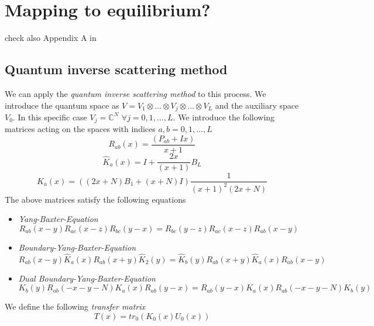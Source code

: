 \documentclass[11pt]{article}
\numberwithin{equation}{section}
\numberwithin{equation}{subsection}
\begin{document}
\section{Mapping to equilibrium?}
{\color{red}
check also Appendix A in
\cite{Alcaraz:1992zc} }

\cite{Sklyanin:1988yz}
\subsection{Quantum inverse scattering method}
We can apply the \textit{quantum inverse scattering method} to this process. We introduce the quantum space as $V=V_{1}\otimes\ldots\otimes V_{j}\otimes\ldots\otimes V_{L}$ and the auxiliary space $V_{0}$. In this specific case $V_{j}=\mathbb{C}^{N}$ $\forall j=0,1,\ldots ,L$. We introduce the following matrices acting on the spaces with indices $a,b=0,1,\ldots,L$
\begin{equation}\label{Rmatrix}
R_{ab}(x)=\frac{(P_{ab}+Ix)}{x+1}
\end{equation}
\begin{equation}\label{KmatrixHAT}
\widehat{K}_{a}(x)=I+\frac{2x}{(x+1)}B_{L}
\end{equation}
\begin{equation}\label{Kmatrix}
K_{a}(x)=\left((2x+N)B_{1}+(x+N)I\right)\frac{1}{(x+1)^{2}(2x+N)}
\end{equation}
The above matrices satisfy the following equations
\begin{itemize}
\item \textit{Yang-Baxter-Equation}
\begin{equation}
R_{ab}(x-y)R_{ac}(x-z)R_{bc}(y-x)=R_{bc}(y-z)R_{ac}(x-z)R_{ab}(x-y)
\end{equation}
\item \textit{Boundary-Yang-Baxter-Equation}
\begin{equation}
R_{ab}(x-y)\widehat{K}_{a}(x)R_{ab}(x+y)\widehat{K}_{2}(y)=\widehat{K}_{b}(y)R_{ab}(x+y)\widehat{K}_{a}(x)R_{ab}(x-y)
\end{equation}
\item \textit{Dual Boundary-Yang-Baxter-Equation}
\begin{equation}
K_{b}(y) R_{ab}(-x-y-N) K_{a}(x)R_{ab}(y-x)=R_{ab}(y-x)K_{a}(x)R_{ab}(-x-y-N)K_{b}(y)
\end{equation}
\end{itemize}
We define the following \textit{transfer matrix}
\begin{equation}
	T(x)=tr_{0}\left(K_{0}(x)U_{0}(x)\right)
\end{equation}
\end{document}

